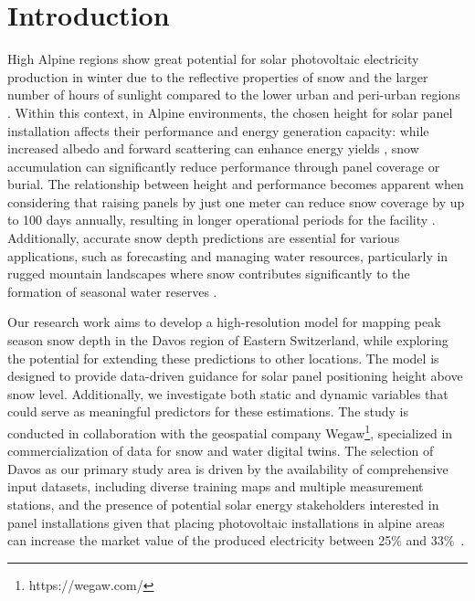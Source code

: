 \documentclass[preprint,12pt]{elsarticle}
\begin{document}

\section{Introduction}
\label{Sec:introduction}

High Alpine regions show great potential for solar photovoltaic electricity production in winter due to the reflective properties of snow \cite{xu2013snow} and the larger number of hours of sunlight compared to the lower urban and peri-urban regions \cite{fenrg.2024}. Within this context, in Alpine environments, the chosen height for solar panel installation affects their performance and energy generation capacity: while increased albedo and forward scattering can enhance energy yields \cite{vonRtte2021}, snow accumulation can significantly reduce performance through panel coverage or burial. The relationship between height and performance becomes apparent when considering that raising panels by just one meter can reduce snow coverage by up to 100 days annually, resulting in longer operational periods for the facility \cite{wegawSuperResolutionSnow}. Additionally, accurate snow depth predictions are essential for various applications, such as forecasting and managing water resources, particularly in rugged mountain landscapes where snow contributes significantly to the formation of seasonal water reserves \cite{dewalle2008principles}.

Our research work aims to develop a high-resolution model for mapping peak season snow depth in the Davos region of Eastern Switzerland, while exploring the potential for extending these predictions to other locations. The model is designed to provide data-driven guidance for solar panel positioning height above snow level. Additionally, we investigate both static and dynamic variables that could serve as meaningful predictors for these estimations. The study is conducted in collaboration with the geospatial company Wegaw\footnote{https://wegaw.com/}, specialized in commercialization of data for snow and water digital twins. The selection of Davos as our primary study area is driven by the availability of comprehensive input datasets, including diverse training maps and multiple measurement stations, and the presence of potential solar energy stakeholders interested in panel installations given that placing photovoltaic installations in alpine areas can increase the market value of the produced electricity between 25\% and 33\%~\cite{Kahl2019,Dujardin2022}. 
\end{document}
